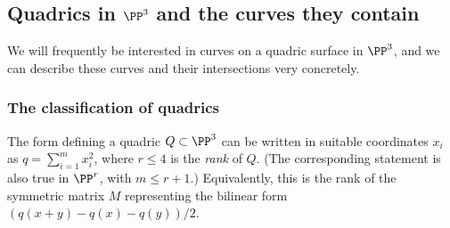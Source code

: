 %
%




\subsection{Quadrics in $\PP^3$ and the curves they contain}\label{Div of quadric}
 
 We will frequently be interested in curves on a quadric surface in $\PP^3$, and we can describe these
curves and their intersections very concretely.

\subsubsection{The classification of quadrics} The form defining a quadric $Q\subset \PP^{3}$ can be written in suitable
coordinates $x_{i}$ as $q = \sum_{i=1}^{m} x_{i}^{2}$, where $r\leq 4$ is the \emph{rank} of $Q$. (The corresponding
statement is also true in $\PP^{r}$, with $m\leq r+1$.) Equivalently, this is the rank of the symmetric matrix $M$
representing the bilinear form $(q(x+y)-q(x)-q(y))/2$.

